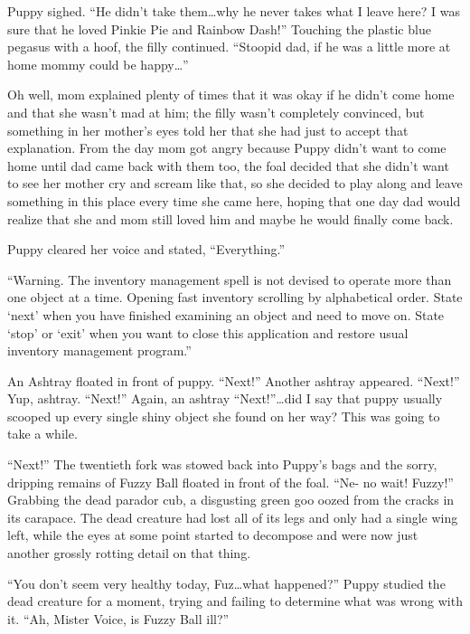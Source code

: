 Puppy sighed. ``He didn't take them\dots why he never takes what I leave here? I was sure that he loved Pinkie Pie and Rainbow Dash!'' Touching the plastic blue pegasus with a hoof, the filly continued. ``Stoopid dad, if he was a little more at home mommy could be happy\dots''

Oh well, mom explained plenty of times that it was okay if he didn't come home and that she wasn't mad at him; the filly wasn't completely convinced, but something in her mother's eyes told her that she had just to accept that explanation. From the day mom got angry because Puppy didn't want to come home until dad came back with them too, the foal decided that she didn't want to see her mother cry and scream like that, so she decided to play along and leave something in this place every time she came here, hoping that one day dad would realize that she and mom still loved him and maybe he would finally come back.

Puppy cleared her voice and stated, ``Everything.''

``{\mt Warning. The inventory management spell is not devised to operate more than one object at a time. Opening fast inventory scrolling by alphabetical order. State `next' when you have finished examining an object and need to move on. State `stop' or `exit' when you want to close this application and restore usual inventory management program.}''

An Ashtray floated in front of puppy. ``Next!'' Another ashtray appeared. ``Next!'' Yup, ashtray. ``Next!'' Again, an ashtray ``Next!''\dots did I say that puppy usually scooped up every single shiny object she found on her way? This was going to take a while.

\horizonline


``Next!'' The twentieth fork was stowed back into Puppy's bags and the sorry, dripping remains of Fuzzy Ball floated in front of the foal. ``Ne- no wait! Fuzzy!'' Grabbing the dead parador cub, a disgusting green goo oozed from the cracks in its carapace. The dead creature had lost all of its legs and only had a single wing left, while the eyes at some point started to decompose and were now just another grossly rotting detail on that thing.

``You don't seem very healthy today, Fuz\dots what happened?'' Puppy studied the dead creature for a moment, trying and failing to determine what was wrong with it. ``Ah, Mister Voice, is Fuzzy Ball ill?''

